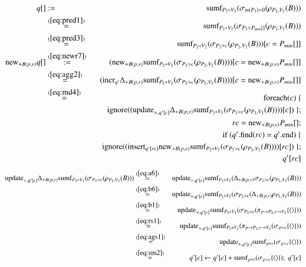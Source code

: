 \documentclass{article}
\newcommand{\tuple}[1]{{\langle#1\rangle}}
\begin{document}
\begin{eqnarray*}
q[] &:=&
\mbox{sumf}_{P_2 * V_2}(\sigma_{m(P_2) > 0} (\rho_{P_2, V_2}(B)))
\\
&\stackrel{(\ref{eq:pred1})}{=}&
\mbox{sumf}_{P_2 * V_2}(\sigma_{P_2 > P_{min}[]} (\rho_{P_2, V_2}(B)))
\\
&\stackrel{(\ref{eq:pred3})}{=}&
\mbox{sumf}_{P_2 * V_2}(\sigma_{P_2 > c} (\rho_{P_2, V_2}(B)))[c=P_{min}[]]
\\
\mathrm{new}_{+B(p,v)} q[]
&\stackrel{(\ref{eq:newr7})}{:=}&
(\mathrm{new}_{+B(p,v)}
\mbox{sumf}_{P_2 * V_2}(\sigma_{P_2 > c} (\rho_{P_2, V_2}(B))))
[c=\mathrm{new}_{+B(p,v)} P_{min}[]]
\\
&\stackrel{(\ref{eq:agg2})}{=}&
(\mathrm{incr}_{q'} \Delta_{+B(p,v)} \mbox{sumf}_{P_2 * V_2}(\sigma_{P_2 > c} (\rho_{P_2 , V_2}(B))))
[c=\mathrm{new}_{+B(p,v)} P_{min}[]]
\\
&\stackrel{(\ref{eq:md4})}{=}&\mathrm{foreach}(\mbox{$c$}) \; \{ \\
&&\quad \mathrm{ignore}((\mathrm{update}_{+, q'[c]} \Delta_{+B(p,v)} \mbox{sumf}_{P_2 * V_2}(\sigma_{P_2 > c} (\rho_{P_2 , V_2}(B))))[c]) \; \};
\\
&& rc = \mathrm{new}_{+B(p,v)} P_{min}[];
\\
&& \mbox{if ($q'$.find($rc$) = $q'$.end)}
\; \{\\
&&\quad \mathrm{ignore}((\mathrm{insert}_{q'[rc]} \mathrm{new}_{+B(p,v)} \mbox{sumf}_{P_2 * V_2}(\sigma_{P_2 > c} (\rho_{P_2 , V_2}(B))))[rc]) \; \};
\\
&& q'[rc]
\\
\end{eqnarray*}
\begin{eqnarray*}
\algupdate_{+, q'[c]} \Delta_{+B(p,v)} \algsumf_{P_2 * V_2}(\sigma_{P_2 > c} (\rho_{P_2 , V_2}(B)))
&\stackrel{(\ref{eq:a6})}{=}&
\algupdate_{+, q'[c]} \algsumf_{P_2 * V_2}(\Delta_{+B(p,v)} \sigma_{P_2 > c} (\rho_{P_2, V_2} (B)))
\\
&\stackrel{(\ref{eq:b6})}{=}&
\algupdate_{+, q'[c]} \algsumf_{P_2 * V_2}(\sigma_{P_2 > c} (\Delta_{+B(p,v)} \rho_{P_2, V_2} (B)))
\\
&\stackrel{(\ref{eq:b1})}{=}&
\algupdate_{+, q'[c]} \algsumf_{P_2 * V_2}(\sigma_{P_2 > c} (\pi_{p\rightarrow P_2, v\rightarrow V_2}\{\tuple{}\}))
\\
&\stackrel{(\ref{eq:rs1})}{=}&
\algupdate_{+, q'[c]} \algsumf_{P_2 * V_2}(\pi_{p\rightarrow P_2, v\rightarrow V_2} (\sigma_{p > c} \{\tuple{}\}))
\\
&\stackrel{(\ref{eq:ags1})}{=}&
\algupdate_{+, q'[c]} \algsumf_{p * v} (\sigma_{p > c} \{\tuple{}\})
\\
&\stackrel{(\ref{eq:sm2})}{=}&
q'[c] \leftarrow q'[c] + \algsumf_{p * v} (\sigma_{p > c} \{\tuple{}\});\; q'[c]
\\
\end{eqnarray*}
\end{document}
